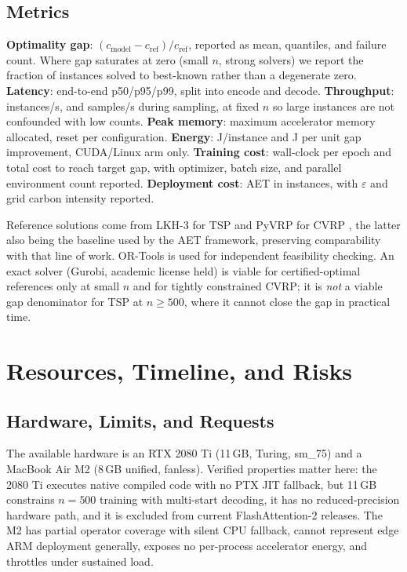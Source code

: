 \documentclass[11pt,a4paper,twocolumn]{article}
\begin{document}
\subsection{Metrics}

\textbf{Optimality gap}: $(c_{\text{model}} - c_{\text{ref}})/c_{\text{ref}}$,
reported as mean, quantiles, and failure count. Where gap saturates at zero (small
$n$, strong solvers) we report the fraction of instances solved to best-known rather
than a degenerate zero. \textbf{Latency}: end-to-end p50/p95/p99, split into encode
and decode. \textbf{Throughput}: instances/s, and samples/s during sampling, at fixed
$n$ so large instances are not confounded with low counts. \textbf{Peak memory}:
maximum accelerator memory allocated, reset per configuration. \textbf{Energy}:
J/instance and J per unit gap improvement, CUDA/Linux arm only. \textbf{Training
cost}: wall-clock per epoch and total cost to reach target gap, with optimizer,
batch size, and parallel environment count reported. \textbf{Deployment cost}: AET
in instances, with $\varepsilon$ and grid carbon intensity reported.

Reference solutions come from LKH-3 for TSP \citep{helsgaun2017lkh3} and PyVRP for
CVRP \citep{wouda2024pyvrp}, the latter also being the baseline used by the AET
framework, preserving comparability with that line of work. OR-Tools
\citep{perron2023ortools} is used for independent feasibility checking. An exact
solver (Gurobi, academic license held) is viable for certified-optimal references
only at small $n$ and for tightly constrained CVRP; it is \emph{not} a viable gap
denominator for TSP at $n \ge 500$, where it cannot close the gap in practical time.

\section{Resources, Timeline, and Risks}
\label{sec:resources}

\subsection{Hardware, Limits, and Requests}

The available hardware is an RTX 2080 Ti (11\,GB, Turing, sm\_75) and a MacBook Air
M2 (8\,GB unified, fanless). Verified properties matter here: the 2080 Ti executes
native compiled code with no PTX JIT fallback, but 11\,GB constrains $n{=}500$
training with multi-start decoding, it has no reduced-precision hardware path, and
it is excluded from current FlashAttention-2 releases. The M2 has partial operator
coverage with silent CPU fallback, cannot represent edge ARM deployment generally,
exposes no per-process accelerator energy, and throttles under sustained load.
\end{document}
